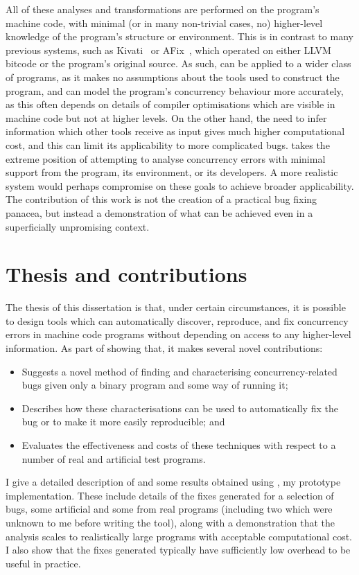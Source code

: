 All of these analyses and transformations are performed on the
program's machine code, with minimal (or in many non-trivial cases,
no) higher-level knowledge of the program's structure or environment.
This is in contrast to many previous systems, such as
Kivati~\cite{Chew2010} or AFix~\cite{Jin2011}, which operated on
either LLVM bitcode or the program's original source.  As such,
{\technique} can be applied to a wider class of programs, as it makes
no assumptions about the tools used to construct the program, and can
model the program's concurrency behaviour more accurately, as this
often depends on details of compiler optimisations which are visible
in machine code but not at higher levels.  On the other hand, the need
to infer information which other tools receive as input gives
{\technique} much higher computational cost, and this can limit its
applicability to more complicated bugs.  {\Technique} takes the
extreme position of attempting to analyse concurrency errors with
minimal support from the program, its environment, or its developers.
A more realistic system would perhaps compromise on these goals to
achieve broader applicability.  The contribution of this work is not
the creation of a practical bug fixing panacea, but instead a
demonstration of what can be achieved even in a superficially
unpromising context.

\section{Thesis and contributions}

The thesis of this dissertation is that, under certain circumstances,
it is possible to design tools which can automatically discover,
reproduce, and fix concurrency errors in machine code programs without
depending on access to any higher-level information.  As part of
showing that, it makes several novel contributions:
\begin{itemize}
\item
  Suggests a novel method of finding and characterising
  concurrency-related bugs given only a binary program and some way of
  running it;
\item
  Describes how these characterisations can be used to automatically
  fix the bug or to make it more easily reproducible; and
\item
  Evaluates the effectiveness and costs of these techniques with
  respect to a number of real and artificial test programs.
\end{itemize}
I give a detailed description of {\technique} and some results
obtained using \implementation, my prototype implementation.  These
include details of the fixes generated for a selection of bugs, some
artificial and some from real programs (including two which were
unknown to me before writing the tool), along with a demonstration
that the analysis scales to realistically large programs with
acceptable computational cost.  I also show that the fixes generated
typically have sufficiently low overhead to be useful in practice.

